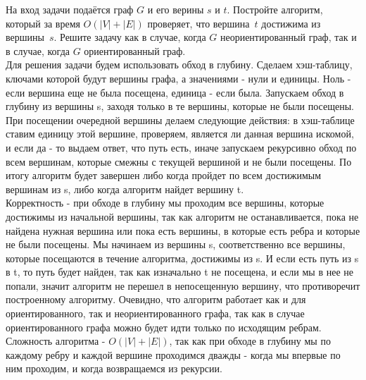 \documentclass[12pt]{extreport}
\theoremstyle{definiton}
\theoremstyle{definition}
\theoremstyle{definition}
\newcounter{problem}
\newcounter{subrproblem}
\def\prsubr{\medskip\noindent\stepcounter{subrproblem}{\bf \asbuk{subrproblem})}\;}
\def\prend{
	\bigskip
}
\begin{document}
\Pr[2] На вход задачи подаётся граф $G$ и его верины $s$ и $t$. Постройте алгоритм, который за время $O(|V| + |E|)$ проверяет, что вершина~$t$ достижима из вершины~$s$. Решите задачу как в случае, когда $G$ неориентированный граф, так и в случае, когда $G$ ориентированный граф.
\newline
\\Для решения задачи будем использовать обход в глубину. Сделаем хэш-таблицу, ключами которой будут вершины графа, а значениями - нули и единицы. Ноль - если вершина еще не была посещена, единица - если была. Запускаем обход в глубину из вершины s, заходя только в те вершины, которые не были посещены. При посещении очередной вершины делаем следующие действия: в хэш-таблице ставим единицу этой вершине, проверяем, является ли данная вершина искомой, и если да - то выдаем ответ, что путь есть, иначе запускаем рекурсивно обход по всем вершинам, которые смежны с текущей вершиной и не были посещены. По итогу алгоритм будет завершен либо когда пройдет по всем достижимым вершинам из s, либо когда алгоритм найдет вершину t.
\\Корректность - при обходе в глубину мы проходим все вершины, которые достижимы из начальной вершины, так как алгоритм не останавливается, пока не найдена нужная вершина или пока есть вершины, в которые есть ребра и которые не были посещены. Мы начинаем из вершины s, соответственно все вершины, которые посещаются в течение алгоритма, достижимы из s. И если есть путь из s в t, то путь будет найден, так как изначально t не посещена, и если мы в нее не попали, значит алгоритм не перешел в непосещенную вершину, что противоречит построенному алгоритму. Очевидно, что алгоритм работает как и для ориентированного, так и неориентированного графа, так как в случае ориентированного графа можно будет идти только по исходящим ребрам.
\\ Сложность алгоритма - $O(|V| + |E|)$, так как при обходе в глубину мы по каждому ребру и каждой вершине проходимся дважды - когда мы впервые по ним проходим, и когда возвращаемся из рекурсии.

\prend

	
	
\end{document}
